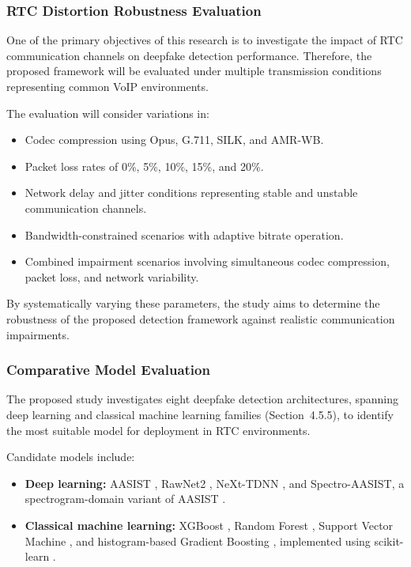 \subsubsection{RTC Distortion Robustness Evaluation}

One of the primary objectives of this research is to investigate the impact of RTC communication channels on deepfake detection performance. Therefore, the proposed framework will be evaluated under multiple transmission conditions representing common VoIP environments.

The evaluation will consider variations in:

\begin{itemize}
\item Codec compression using Opus, G.711, SILK, and AMR-WB.
\item Packet loss rates of 0\%, 5\%, 10\%, 15\%, and 20\%.
\item Network delay and jitter conditions representing stable and unstable communication channels.
\item Bandwidth-constrained scenarios with adaptive bitrate operation.
\item Combined impairment scenarios involving simultaneous codec compression, packet loss, and network variability.
\end{itemize}

By systematically varying these parameters, the study aims to determine the robustness of the proposed detection framework against realistic communication impairments.


\subsubsection{Comparative Model Evaluation}

The proposed study investigates eight deepfake detection architectures, spanning deep learning and classical machine learning families (Section~4.5.5), to identify the most suitable model for deployment in RTC environments.

Candidate models include:

\begin{itemize}
\item \textbf{Deep learning:} AASIST \cite{Jung2022_aasist}, RawNet2 \cite{Tak2021_rawnet2}, NeXt-TDNN \cite{Heo2024_nexttdnn}, and Spectro-AASIST, a spectrogram-domain variant of AASIST \cite{Jung2022_aasist}.
\item \textbf{Classical machine learning:} XGBoost \cite{Chen2016_xgboost}, Random Forest \cite{Breiman2001_rf}, Support Vector Machine \cite{Cortes1995_svm}, and histogram-based Gradient Boosting \cite{Ke2017_lightgbm}, implemented using scikit-learn \cite{Pedregosa2011_sklearn}.
\end{itemize}

